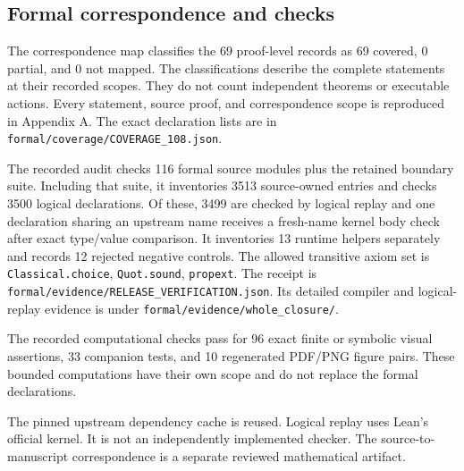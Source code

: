 \subsection{Formal correspondence and checks}
The correspondence map classifies the 69 proof-level records as 69 covered, 0 partial, and 0 not mapped. The classifications describe the complete statements at their recorded scopes. They do not count independent theorems or executable actions. Every statement, source proof, and correspondence scope is reproduced in Appendix A. The exact declaration lists are in \nolinkurl{formal/coverage/COVERAGE_108.json}.

The recorded audit checks 116 formal source modules plus the retained boundary suite. Including that suite, it inventories 3513 source-owned entries and checks 3500 logical declarations. Of these, 3499 are checked by logical replay and one declaration sharing an upstream name receives a fresh-name kernel body check after exact type/value comparison. It inventories 13 runtime helpers separately and records 12 rejected negative controls. The allowed transitive axiom set is \nolinkurl{Classical.choice}, \nolinkurl{Quot.sound}, \nolinkurl{propext}. The receipt is \nolinkurl{formal/evidence/RELEASE_VERIFICATION.json}. Its detailed compiler and logical-replay evidence is under \nolinkurl{formal/evidence/whole_closure/}.

The recorded computational checks pass for 96 exact finite or symbolic visual assertions, 33 companion tests, and 10 regenerated PDF/PNG figure pairs. These bounded computations have their own scope and do not replace the formal declarations.

The pinned upstream dependency cache is reused. Logical replay uses Lean's official kernel. It is not an independently implemented checker. The source-to-manuscript correspondence is a separate reviewed mathematical artifact.
